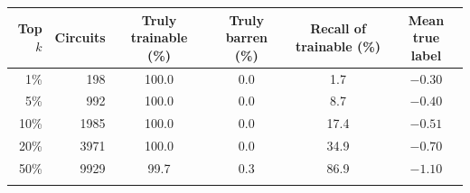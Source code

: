\begin{tabular}{rrcccc}
\toprule
Top $k$ & Circuits & Truly trainable (\%) & Truly barren (\%) & Recall of trainable (\%) & Mean true label \\
\midrule
1\% & 198 & 100.0 & 0.0 & 1.7 & $-0.30$ \\
5\% & 992 & 100.0 & 0.0 & 8.7 & $-0.40$ \\
10\% & 1985 & 100.0 & 0.0 & 17.4 & $-0.51$ \\
20\% & 3971 & 100.0 & 0.0 & 34.9 & $-0.70$ \\
50\% & 9929 & 99.7 & 0.3 & 86.9 & $-1.10$ \\
\botrule
\end{tabular}
